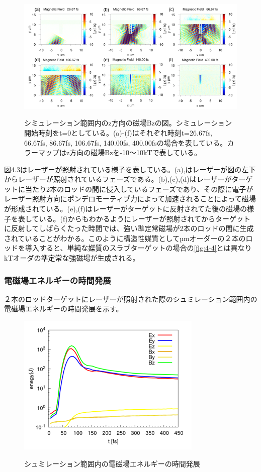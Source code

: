 \documentclass[a4paper,11pt,titlepage]{jarticle}
\numberwithin{equation}{section} %
\begin{document}
  \begin{figure}[H]
    \begin{center}
      \includegraphics[scale=0.5]{./image/4-13-2rod_Bz.png}
      \label{fig:4-2-3}
      \caption{シミュレーション範囲内のz方向の磁場Bzの図。シミュレーション開始時刻をt=0としている。(a)-(f)はそれぞれ時刻t=26.67fs, 66.67fs, 86.67fs, 106.67fs, 140.00fs, 400.00fsの場合を表している。カラーマップはz方向の磁場Bzを-10～10kTで表している。}
    \end{center}
  \end{figure}
  図4.3はレーザーが照射されている様子を表している。(a),はレーザーが図の左下からレーザーが照射されているフェーズである。(b),(c),(d)はレーザーがターゲットに当たり2本のロッドの間に侵入しているフェーズであり、その際に電子がレーザー照射方向にポンデロモーティブ力によって加速されることによって磁場が形成されている。(e),(f)はレーザーがターゲットに反射されてた後の磁場の様子を表している。(f)からもわかるようにレーザーが照射されてからターゲットに反射してしばらくたった時間では、強い準定常磁場が2本のロッドの間に生成されていることがわかる。このように構造性媒質としてµmオーダーの２本のロッドを導入すると、単純な媒質のスラブターゲットの場合の\ref*{fig:4-4}とは異なりkTオーダの準定常な強磁場が生成される。

  \subsubsection{電磁場エネルギーの時間発展}
  ２本のロッドターゲットにレーザーが照射された際のシュミレーション範囲内の電磁場エネルギーの時間発展を示す。
  
  \begin{figure}[H]
    \begin{center}
      \includegraphics[scale=1]{./image/4-15-2rod.png}
      \label{fig:4-4-4}
      \caption{シュミレーション範囲内の電磁場エネルギーの時間発展}
    \end{center}
  \end{figure}
  
\end{document}
